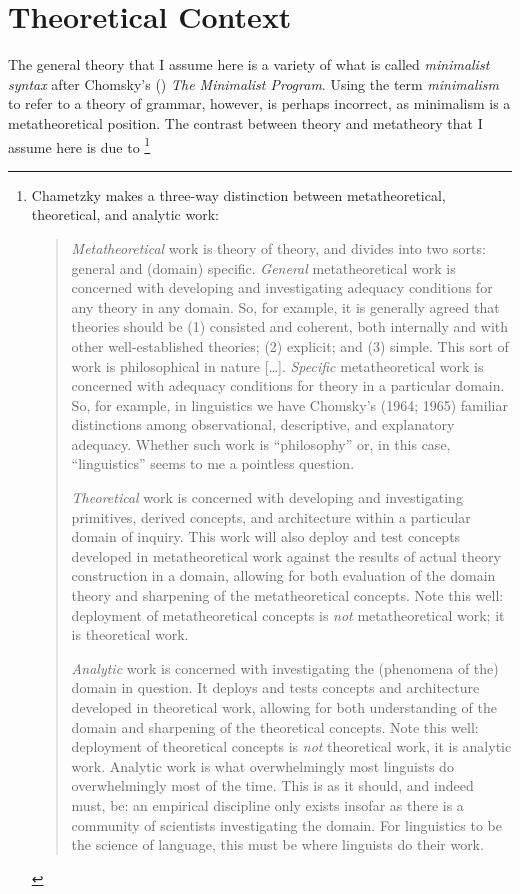 \documentclass[MilwayThesis]{subfiles}
\begin{document}
\section{Theoretical Context}\label{sec:standard}
The general theory that I assume here is a variety of what is called \textit{minimalist syntax} after Chomsky's (\citeyear{chomsky1995minimalist}) \textit{The Minimalist Program}.
Using the term \textit{minimalism} to refer to a theory of grammar, however, is perhaps incorrect, as minimalism is a metatheoretical position.
The contrast between theory and metatheory that I assume here is due to \textcite{chametzky1996theory}\footnote{
	Chametzky makes a three-way distinction between metatheoretical, theoretical, and analytic work:
	\begin{quote}
		\textit{Metatheoretical} work is theory of theory, and divides into two sorts: general and (domain) specific.
		\textit{General} metatheoretical work is concerned with developing and investigating adequacy conditions for any theory in any domain.
		So, for example, it is generally agreed that theories should be (1) consisted and coherent, both internally and with other well-established theories; (2) explicit; and (3) simple. This sort of work is philosophical in nature [\ldots].
		\textit{Specific} metatheoretical work is concerned with adequacy conditions for theory in a particular domain.
		So, for example, in linguistics	we have Chomsky's (1964; 1965) familiar distinctions among observational, descriptive, and explanatory adequacy.
		Whether such work is ``philosophy'' or, in this case, ``linguistics'' seems to me a pointless question.
		
		\textit{Theoretical} work is concerned with developing and investigating primitives, derived concepts, and architecture within a particular domain of inquiry. 
		This work will also deploy and test concepts developed in metatheoretical work against the results of actual theory construction in a domain, allowing for both evaluation of the domain theory and sharpening of the metatheoretical concepts. 
		Note this well: deployment of metatheoretical concepts is \textit{not} metatheoretical work; it is theoretical work.
		
		\textit{Analytic} work is concerned with investigating the (phenomena of the) domain in question.
		It deploys and tests concepts and architecture developed in theoretical work, allowing for both understanding of the domain and sharpening of the theoretical concepts. 
		Note this well: deployment of theoretical concepts is \textit{not} theoretical work, it is analytic work. 
		Analytic work is what overwhelmingly most linguists do overwhelmingly most of the time.
		This is as it should, and indeed must, be: an empirical discipline only exists insofar as there is a community of scientists investigating the domain.
		For linguistics to be the science of language, this must be where linguists do their work.
		\parencite[xvii\textit{ff}]{chametzky1996theory}
	\end{quote}
	}
\end{document}
